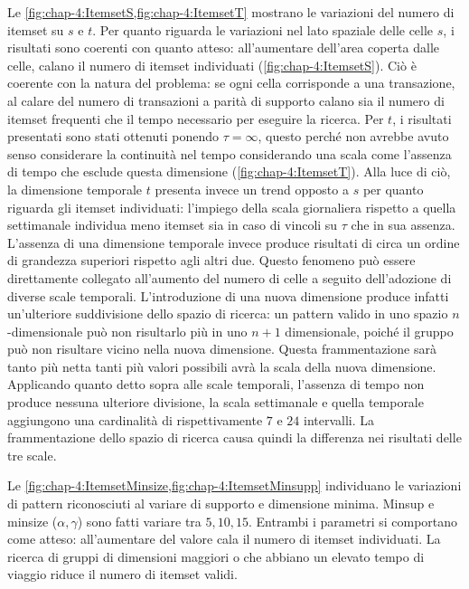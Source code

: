Le \cref{fig:chap-4:ItemsetS,fig:chap-4:ItemsetT} mostrano le variazioni del numero di itemset su \(s\) e \(t\).
Per quanto riguarda le variazioni nel lato spaziale delle celle \(s\), i risultati sono coerenti con quanto atteso: all'aumentare dell'area coperta dalle celle, calano il numero di itemset individuati (\cref{fig:chap-4:ItemsetS}).
Ciò è coerente con la natura del problema: se ogni cella corrisponde a una transazione, al calare del numero di transazioni a parità di supporto calano sia il numero di itemset frequenti che il tempo necessario per eseguire la ricerca.
Per \(t\), i risultati presentati sono stati ottenuti ponendo \(\tau = \infty\), questo perché non avrebbe avuto senso considerare la continuità nel tempo considerando una scala come l'assenza di tempo che esclude questa dimensione (\cref{fig:chap-4:ItemsetT}).
Alla luce di ciò, la dimensione temporale \(t\) presenta invece un trend opposto a \(s\) per quanto riguarda gli itemset individuati: l'impiego della scala giornaliera rispetto a quella settimanale individua meno itemset sia in caso di vincoli su \(\tau\) che in sua assenza.
L'assenza di una dimensione temporale invece produce risultati di circa un ordine di grandezza superiori rispetto agli altri due.
Questo fenomeno può essere direttamente collegato all'aumento del numero di celle a seguito dell'adozione di diverse scale temporali.
L'introduzione di una nuova dimensione produce infatti un'ulteriore suddivisione dello spazio di ricerca: un pattern valido in uno spazio \(n\)-dimensionale può non risultarlo più in uno \(n+1\) dimensionale, poiché il gruppo può non risultare vicino nella nuova dimensione.
Questa frammentazione sarà tanto più netta tanti più valori possibili avrà la scala della nuova dimensione.
Applicando quanto detto sopra alle scale temporali, l'assenza di tempo non produce nessuna ulteriore divisione, la scala settimanale e quella temporale aggiungono una cardinalità di rispettivamente \(7\) e \(24\) intervalli.
La frammentazione dello spazio di ricerca causa quindi la differenza nei risultati delle tre scale.


Le \cref{fig:chap-4:ItemsetMinsize,fig:chap-4:ItemsetMinsupp} individuano le variazioni di pattern riconosciuti al variare di supporto e dimensione minima.
Minsup e minsize (\(\alpha, \gamma\)) sono fatti variare tra \(5, 10, 15\).
Entrambi i parametri si comportano come atteso: all'aumentare del valore cala il numero di itemset individuati.
La ricerca di gruppi di dimensioni maggiori o che abbiano un elevato tempo di viaggio riduce il numero di itemset validi.

